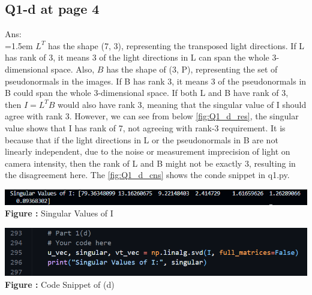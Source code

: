 \documentclass{article}
\begin{document}
	\subsection*{Q1-d at page 4}
	Ans:\\
	\hangindent=1.5em \hspace{1.5em} $L^{T}$ has the shape (7, 3), representing the transposed light directions. If L has rank of 3, it means 3 of the light directions in L can span the whole 3-dimensional space. Also, $B$ has the shape of (3, P), representing the set of pseudonormals in the images. If B has rank 3, it means 3 of the pseudonormals in B could span the whole 3-dimensional space. If both L and B have rank of 3, then $I = L^TB$ would also have rank 3, meaning that the singular value of I should agree with rank 3.\newline
	However, we can see from below \autoref{fig:Q1_d_res}, the singular value shows that I has rank of 7, not agreeing with rank-3 requirement. It is because that if the light directions in L or the pseudonormals in B are not linearly independent, due to the noise or measurement imprecision of light on camera intensity, then the rank of L and B might not be exactly 3, resulting in the disagreement here. The \autoref{fig:Q1_d_cns} shows the conde snippet in q1.py.
	\newline
	
	\begin{minipage}{1\linewidth}
	\centering
	\includegraphics{./Q1_d_res.png}
	  \\%
	\textbf{Figure \thefigure:} Singular Values of I  %
	\label{fig:Q1_d_res}         %
	\end{minipage}
	\newline
	\newline
	
	\begin{minipage}{1\linewidth}
	\centering
	\includegraphics[width=0.8\columnwidth]{./Q1_d_cns.png}
	  \\%
	\textbf{Figure \thefigure:} Code Snippet of (d)  %
	\label{fig:Q1_d_cns}         %
	\end{minipage}	
	
\end{document}
